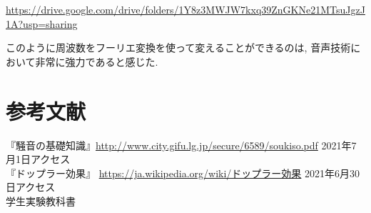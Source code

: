 \documentclass{ltjsarticle}
\begin{document}
\url{https://drive.google.com/drive/folders/1Y8z3MWJW7kxq39ZnGKNe21MTsuJgzJ1A?usp=sharing}

このように周波数をフーリエ変換を使って変えることができるのは, 音声技術において非常に強力であると感じた. 

\section{参考文献}
『騒音の基礎知識』\url{http://www.city.gifu.lg.jp/secure/6589/soukiso.pdf} 2021年7月1日アクセス\\
『ドップラー効果』 \url{https://ja.wikipedia.org/wiki/ドップラー効果} 2021年6月30日アクセス\\
学生実験教科書
\end{document}
